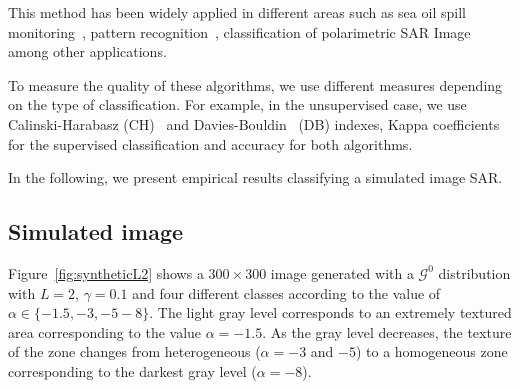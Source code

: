 \documentclass[journal]{IEEEtran}
\begin{document}
This method has been widely applied in different areas such as sea oil spill monitoring~\cite{Fan2015}, pattern recognition~\cite{svmtutorialBURGES1999}, classification of polarimetric SAR Image~\cite{Palacio2019,Zhang2010} among other applications.

To measure the quality of these algorithms, we use different measures depending on the type of classification. For example, in the unsupervised case, we use Calinski-Harabasz (CH)~\cite{Calinski1974} and Davies-Bouldin~\cite{Davies1979} (DB) indexes,  Kappa coefficients for the supervised classification and accuracy for both algorithms. 

In the following, we present empirical results classifying a simulated image SAR.



\subsection{Simulated image}
\label{sec:synthetic}

Figure~\ref{fig:syntheticL2} shows a $300 \times 300$ image generated with a $\mathcal{G}^0$ distribution with $L=2$, $\gamma=0.1$ and four different classes according to the value of $\alpha \in \{-1.5, -3, -5 -8\}$. The light gray level corresponds to an extremely textured area corresponding to the value $\alpha=-1.5$. As the gray level decreases, the texture of the zone changes from heterogeneous ($\alpha=-3$ and $-5$) to a homogeneous zone corresponding to the darkest gray level ($\alpha=-8$). 
\end{document}
